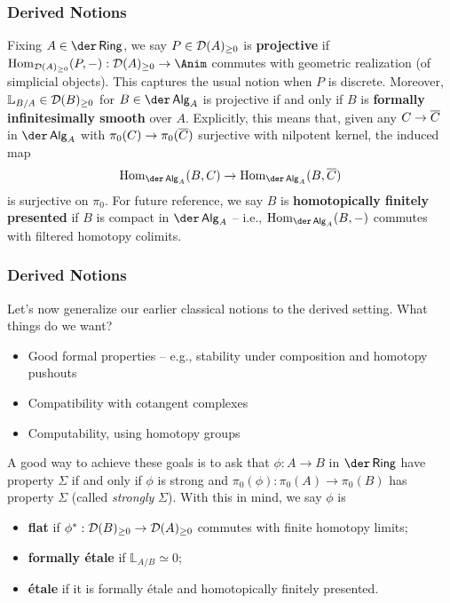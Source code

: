 \documentclass[11pt]{beamer}
\newcommand{\LL}{\mathbb{L}}
\begin{document}
\begin{frame}
\frametitle{Derived Notions}
\pause Fixing $A\in\der\Ring$, we say $P\in\mathcal{D}(A)_{\geq0}$ is \textbf{projective} if $\Hom_{\D(A)_{\geq0}}(P,-): \D(A)_{\geq0}\to\Anim$ commutes with geometric realization (of simplicial objects). This captures the usual notion when $P$ is discrete. \pause Moreover, $\LL_{B/A}\in\D(B)_{\geq0}$ for $B\in\der\Alg_A$ is projective if and only if $B$ is \textbf{formally infinitesimally smooth} over $A$. Explicitly, this means that, given any $C\to\overline{C}$ in $\der\Alg_A$ with $\pi_0(C)\to\pi_0(\overline{C})$ surjective with nilpotent kernel, the induced map
$$\Hom_{\der\Alg_A}(B,C)\to\Hom_{\der\Alg_A}(B,\ov{C})$$
is surjective on $\pi_0$. \pause For future reference, we say $B$ is \textbf{homotopically finitely presented} if $B$ is compact in $\der\Alg_A$ -- i.e., $\Hom_{\der\Alg_A}(B,-)$ commutes with filtered homotopy colimits.
\end{frame}

\begin{frame}
\frametitle{Derived Notions}
\pause Let's now generalize our earlier classical notions to the derived setting. What things do we want?
\begin{itemize}
\pause\item Good formal properties -- e.g., stability under composition and homotopy pushouts
\pause\item Compatibility with cotangent complexes
\pause\item Computability, using homotopy groups
\end{itemize}
\pause A good way to achieve these goals is to ask that $\phi: A\to B$ in $\der\Ring$ have property $\Sigma$ if and only if $\phi$ is strong and $\pi_0(\phi): \pi_0(A)\to\pi_0(B)$ has property $\Sigma$ (called \emph{strongly} $\Sigma$). \pause With this in mind, we say $\phi$ is
\begin{itemize}
\pause\item \textbf{flat} if $\phi^*: \mathcal{D}(B)_{\geq0}\to\mathcal{D}(A)_{\geq0}$ commutes with finite homotopy limits;
\pause\item \textbf{formally \'{e}tale} if $\LL_{A/B}\simeq0$;
\pause\item \textbf{\'{e}tale} if it is formally \'{e}tale and homotopically finitely presented.
\end{itemize}
\end{frame}
\end{document}
